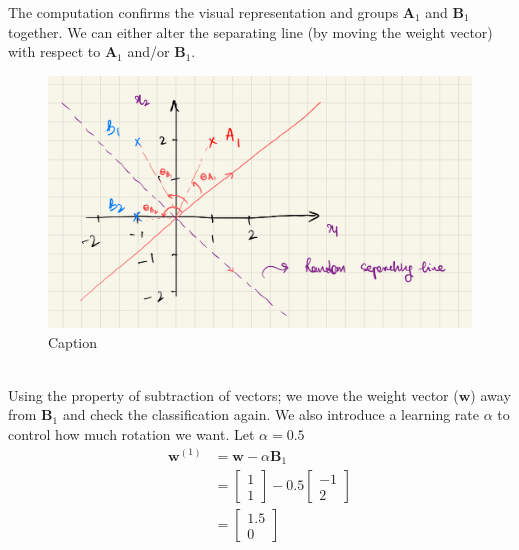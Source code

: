 The computation confirms the visual representation and groups $\textbf{A}_1$ and $\textbf{B}_1$ together. We can either alter the separating line (by moving the weight vector) with respect to $\textbf{A}_1$ and/or $\textbf{B}_1$.\vspace{50mm}
\begin{figure}[h]
  \centering
  \includegraphics[scale=0.15]{CHAPTER_2/c2_fig_perceptron_example_3.jpeg}
  \caption{Caption}
  \label{fig:perceptron_example_3}
\end{figure}\\
Using the property of subtraction of vectors; we move the weight vector ($\textbf{w}$) away from $\textbf{B}_1$ and check the classification again. We  also introduce a learning rate $\alpha$ to control how much rotation we want. Let $\alpha = 0.5$
\begin{align}
  \textbf{w}^{(1)} &= \textbf{w} - \alpha\textbf{B}_1 \\
  &= \begin{bmatrix}
    1 \\
    1
  \end{bmatrix} - 0.5\begin{bmatrix}
    -1 \\
    2
  \end{bmatrix} \\
  & = \begin{bmatrix}
    1.5 \\
    0
  \end{bmatrix}
\end{align}\\

